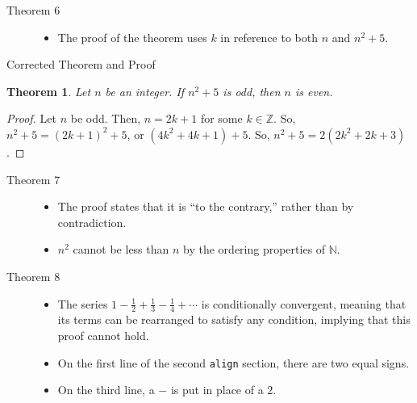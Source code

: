 \documentclass[9pt]{extarticle}
\newtheorem{theorem}{Theorem}
\newcommand{\N}{\mathbb{N}}
\newcommand{\Z}{\mathbb{Z}}
\begin{document}
  \begin{description}
    \item[Theorem 6]\hfill
      \begin{itemize}
        \item The proof of the theorem uses $k$ in reference to both $n$ and $n^2 + 5$.
      \end{itemize}
  \end{description}
  \begin{problem}{Corrected Theorem and Proof}
    \begin{theorem}
      Let $n$ be an integer. If $n^2 + 5$ is odd, then $n$ is even.
    \end{theorem}
    \begin{proof}
      Let $n$ be odd. Then, $n = 2k + 1$ for some $k\in\Z$. So, $n^2 + 5 = (2k+1)^2 + 5$, or $(4k^2 + 4k + 1) + 5$. So, $n^2 + 5 = 2(2k^2 + 2k + 3)$.
    \end{proof}
  \end{problem}
  \begin{description}
    \item[Theorem 7] \hfill
      \begin{itemize}
        \item The proof states that it is ``to the contrary,'' rather than by contradiction.
        \item $n^2$ cannot be less than $n$ by the ordering properties of $\N$.
      \end{itemize}
  \end{description}
  \begin{description}
    \item[Theorem 8]\hfill
      \begin{itemize}
        \item The series $1 - \frac{1}{2} + \frac{1}{3} - \frac{1}{4} + \cdots$ is conditionally convergent, meaning that its terms can be rearranged to satisfy any condition, implying that this proof cannot hold.
        \item On the first line of the second \verb|align| section, there are two equal signs.
        \item On the third line, a $-$ is put in place of a $2$.
      \end{itemize}
  \end{description}
\end{document}
